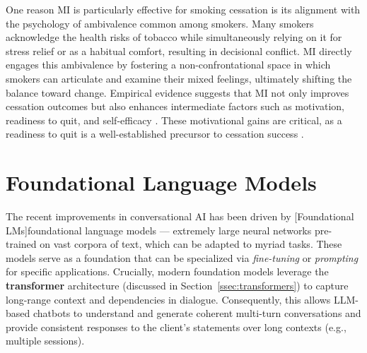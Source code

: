 One reason MI is particularly effective for smoking cessation is its alignment with the psychology of ambivalence common among smokers. Many smokers acknowledge the health risks of tobacco while simultaneously relying on it for stress relief or as a habitual comfort, resulting in decisional conflict. MI directly engages this ambivalence by fostering a non-confrontational space in which smokers can articulate and examine their mixed feelings, ultimately shifting the balance toward change. Empirical evidence suggests that MI not only improves cessation outcomes but also enhances intermediate factors such as motivation, readiness to quit, and self-efficacy \cite{Boudreaux2012, Hettema2005}. These motivational gains are critical, as a readiness to quit is a well-established precursor to cessation success \cite{West2006}.




\section{Foundational Language Models} \label{sec:foundational_models}
The recent improvements in conversational AI has been driven by [Foundational LMs]foundational language models \cite{stanfordCRFM2021} --- extremely large neural networks pre-trained on vast corpora of text, which can be adapted to myriad tasks. These models serve as a foundation that can be specialized via \emph{fine-tuning} or \emph{prompting} for specific applications. Crucially, modern foundation models leverage the \textbf{transformer} architecture (discussed in Section~\ref{ssec:transformers}) to capture long-range context and dependencies in dialogue. Consequently, this allows LLM-based chatbots to understand and generate coherent multi-turn conversations and provide consistent responses to the client's statements over long contexts (e.g., multiple sessions).

